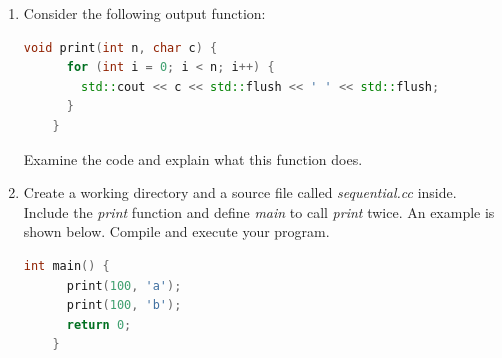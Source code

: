 \documentclass[12pt]{book}
\begin{document}
\begin{enumerate}[label=Activity \arabic*:]
  
\item Consider the following output function:

  \begin{lstlisting}[language=C++]
    void print(int n, char c) {
      for (int i = 0; i < n; i++) {
        std::cout << c << std::flush << ' ' << std::flush;
      }
    }
  \end{lstlisting}

  Examine the code and explain what this function does.

\item Create a working directory and a source file called \emph{sequential.cc} inside. Include the \emph{print} function and define \emph{main} to call \emph{print} twice. An example is shown below. Compile and execute your program.

  \begin{lstlisting}[language=c]
    int main() {
      print(100, 'a');
      print(100, 'b');
      return 0;
    }
  \end{lstlisting}
\end{enumerate}





\end{document}
